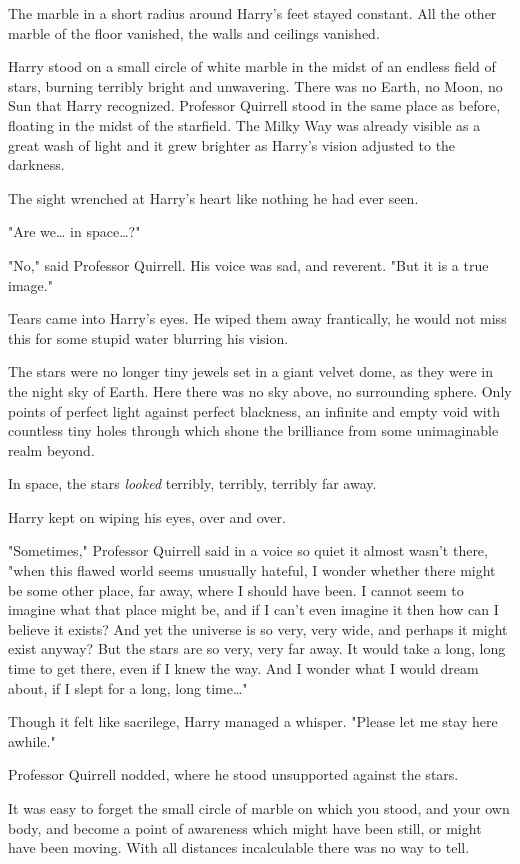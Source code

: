 The marble in a short radius around Harry's feet stayed constant. All the other marble of the floor vanished, the walls and ceilings vanished.

Harry stood on a small circle of white marble in the midst of an endless field of stars, burning terribly bright and unwavering. There was no Earth, no Moon, no Sun that Harry recognized. Professor Quirrell stood in the same place as before, floating in the midst of the starfield. The Milky Way was already visible as a great wash of light and it grew brighter as Harry's vision adjusted to the darkness.

The sight wrenched at Harry's heart like nothing he had ever seen.

"Are we{\ldots} in space{\ldots}?"

"No," said Professor Quirrell. His voice was sad, and reverent. "But it is a true image."

Tears came into Harry's eyes. He wiped them away frantically, he would not miss this for some stupid water blurring his vision.

The stars were no longer tiny jewels set in a giant velvet dome, as they were in the night sky of Earth. Here there was no sky above, no surrounding sphere. Only points of perfect light against perfect blackness, an infinite and empty void with countless tiny holes through which shone the brilliance from some unimaginable realm beyond.

In space, the stars \emph{looked} terribly, terribly, terribly far away.

Harry kept on wiping his eyes, over and over.

"Sometimes," Professor Quirrell said in a voice so quiet it almost wasn't there, "when this flawed world seems unusually hateful, I wonder whether there might be some other place, far away, where I should have been. I cannot seem to imagine what that place might be, and if I can't even imagine it then how can I believe it exists? And yet the universe is so very, very wide, and perhaps it might exist anyway? But the stars are so very, very far away. It would take a long, long time to get there, even if I knew the way. And I wonder what I would dream about, if I slept for a long, long time{\ldots}"

Though it felt like sacrilege, Harry managed a whisper. "Please let me stay here awhile."

Professor Quirrell nodded, where he stood unsupported against the stars.

It was easy to forget the small circle of marble on which you stood, and your own body, and become a point of awareness which might have been still, or might have been moving. With all distances incalculable there was no way to tell.

